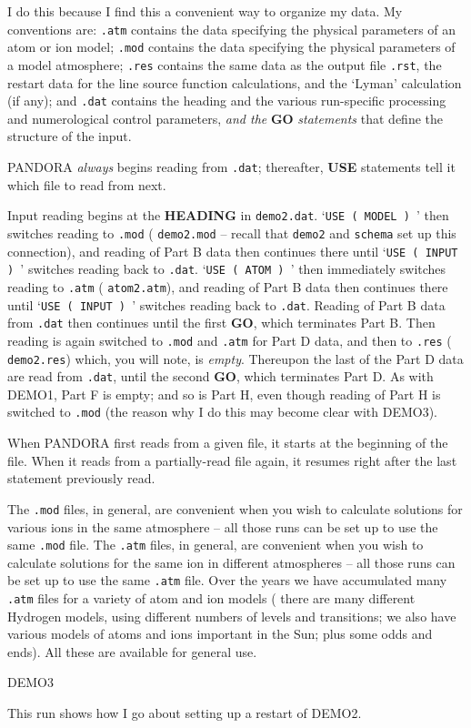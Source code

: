 I do this because I find this a convenient way to organize my data. My
conventions are: {\tt .atm} contains the data specifying the physical parameters
of an atom or ion model; {\tt .mod} contains the data specifying the physical
parameters of a model atmosphere; {\tt .res} contains the same data as
the output file {\tt .rst}, {\ie} the restart data for the line source
function calculations, and the `Lyman' calculation (if any); and {\tt .dat}
contains the heading and
the various run-specific processing and numerological control
parameters, {\it and the} {\bf GO} {\it statements} that define the structure
of the input.

PANDORA {\it always} begins reading from {\tt .dat};
thereafter, {\bf USE} statements tell it which file to read from next.

Input reading begins at the {\bf HEADING} in {\tt demo2.dat}.
`{\tt USE ( MODEL ) }' then switches reading to {\tt .mod} ({\ie}
{\tt demo2.mod} -- recall that {\tt demo2} and {\tt schema}
set up this connection), and reading of Part B data then continues there
until `{\tt USE ( INPUT ) }' switches reading back to {\tt .dat}. 
`{\tt USE ( ATOM ) }' then immediately switches reading
to {\tt .atm} ({\ie} {\tt atom2.atm}),
and reading of Part B data then continues there until `{\tt USE ( INPUT ) }'
switches reading back to {\tt .dat}. Reading of Part B data from {\tt .dat}
then continues until the first {\bf GO}, which terminates Part B. Then reading
is again switched to {\tt .mod} and {\tt .atm} for Part D data, and then
to {\tt .res} ({\ie} {\tt demo2.res}) which, you will note, is
{\it empty}. Thereupon the last of the Part D data are read from
{\tt .dat}, until the second {\bf GO}, which terminates Part D. As with DEMO1,
Part F is empty; and so is Part H, even though reading of Part H is
switched to {\tt .mod} (the reason why I do this may become clear with
DEMO3).

When PANDORA first reads from a given file, it starts at the beginning of
the file. When it reads from a partially-read file again, it resumes right
after the last statement previously read.

The {\tt .mod} files, in general, are convenient when you wish to calculate
solutions for various ions in the same atmosphere -- all those runs can be
set up to use the same {\tt .mod} file. The {\tt .atm} files, in general,
are convenient when you wish to calculate solutions for the same ion in
different atmospheres -- all those runs can be set up to use the same 
{\tt .atm} file. Over the years we have accumulated many {\tt .atm} files
for a variety of atom and ion models ({\eg} there are many different
Hydrogen models, using different numbers of levels and transitions;
we also have various models of atoms and ions important in the Sun;
plus some odds and ends). All these are available for general use.
\blankline
\blankline
\centerline{DEMO3}
\blankline
This run shows how I go about setting up a restart of DEMO2.

